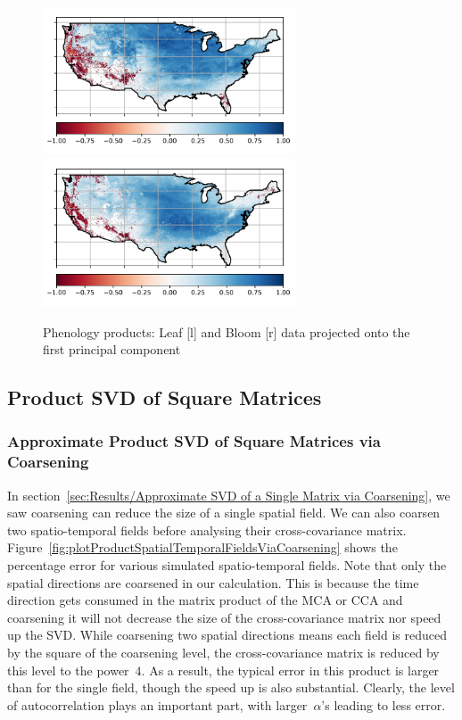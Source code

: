 \documentclass[ijgi,article,submit,moreauthors,pdftex,10pt,a4paper]{Definitions/mdpi}
\begin{document}
\begin{figure}[H]
\centering
\includegraphics[width=7.5cm]{Results/SpatialModeV01Grid.pdf} ~~~~~ \includegraphics[width=7.5cm]{Results/SpatialModeU01Grid.pdf}
\caption{Phenology products: Leaf [l] and Bloom [r] data projected onto the first principal component}
\label{fig:maps}
\end{figure}

\subsection{Product SVD of Square Matrices}
\label{sec:Results/Product SVD of Square Matrices}

\subsubsection{Approximate Product SVD of Square Matrices via Coarsening}
\label{sec:Results/Approximate Product SVD of Square Matrices via Coarsening}

In section~\ref{sec:Results/Approximate SVD of a Single Matrix via Coarsening}, we saw coarsening can reduce the size of a single spatial field. We can also coarsen two spatio-temporal fields before analysing their cross-covariance matrix. Figure~\ref{fig:plotProductSpatialTemporalFieldsViaCoarsening} shows the percentage error for various simulated spatio-temporal fields. Note that only the spatial directions are coarsened in our calculation. This is because the time direction gets consumed in the matrix product of the MCA or CCA and coarsening it will not decrease the size of the cross-covariance matrix nor speed up the SVD. While coarsening two spatial directions means each field is reduced by the square of the coarsening level, the cross-covariance matrix is reduced by this level to the power~$4$. As a result, the typical error in this product is larger than for the single field, though the speed up is also substantial. Clearly, the level of autocorrelation plays an important part, with larger~$\alpha$'s leading to less error.%
\end{document}
